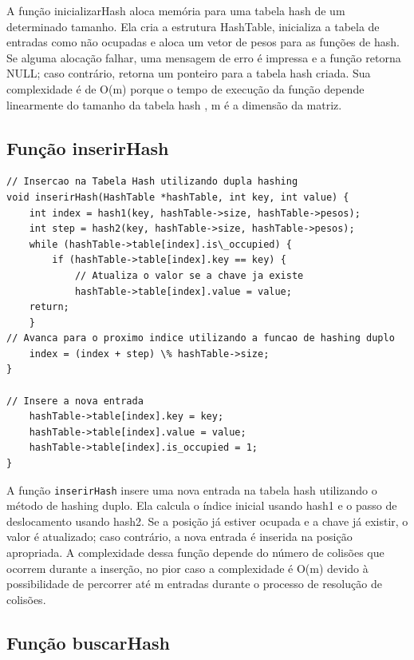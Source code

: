 \documentclass{article}
\begin{document}
\par A função inicializarHash aloca memória para uma tabela hash de um determinado tamanho. Ela cria a estrutura HashTable, inicializa a tabela de entradas como não ocupadas e aloca um vetor de pesos para as funções de hash. Se alguma alocação falhar, uma mensagem de erro é impressa e a função retorna NULL; caso contrário, retorna um ponteiro para a tabela hash criada. Sua complexidade é de O(m) porque o tempo de execução da função depende linearmente do tamanho da tabela hash , m é a dimensão da matriz.

\subsection{Função inserirHash}

\begin{lstlisting}[caption={},label={lst:cod1},language={[x86masm]Assembler}]
// Insercao na Tabela Hash utilizando dupla hashing
void inserirHash(HashTable *hashTable, int key, int value) {
    int index = hash1(key, hashTable->size, hashTable->pesos);
    int step = hash2(key, hashTable->size, hashTable->pesos);
    while (hashTable->table[index].is\_occupied) {
        if (hashTable->table[index].key == key) {
            // Atualiza o valor se a chave ja existe
            hashTable->table[index].value = value;
    return;
    }
// Avanca para o proximo indice utilizando a funcao de hashing duplo
    index = (index + step) \% hashTable->size;
}

// Insere a nova entrada
    hashTable->table[index].key = key;
    hashTable->table[index].value = value;
    hashTable->table[index].is_occupied = 1;
}
\end{lstlisting}

\par A função \verb|inserirHash| insere uma nova entrada na tabela hash utilizando o método de hashing duplo. Ela calcula o índice inicial usando hash1 e o passo de deslocamento usando hash2. Se a posição já estiver ocupada e a chave já existir, o valor é atualizado; caso contrário, a nova entrada é inserida na posição apropriada. A complexidade dessa função depende do número de colisões que ocorrem durante a inserção, no pior caso a complexidade é O(m) devido à possibilidade de percorrer até m entradas durante o processo de resolução de colisões.

 

\subsection{Função buscarHash}
\end{document}
